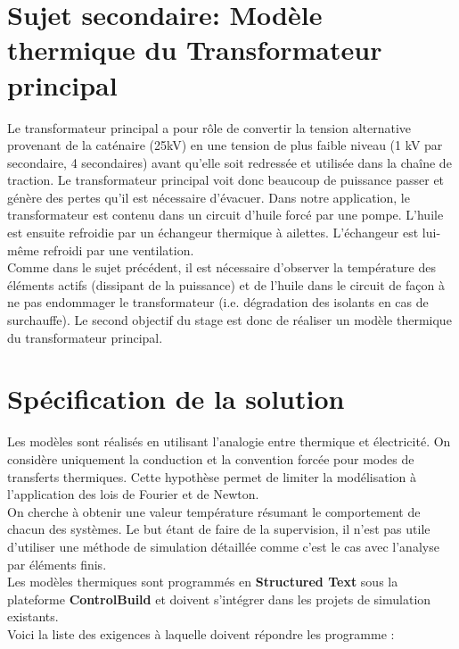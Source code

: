\documentclass[a4paper]{report}
\begin{document}
	\section{Sujet secondaire: Modèle thermique du Transformateur principal}
	Le transformateur principal a pour rôle de convertir la tension alternative provenant de la caténaire (25kV) en une tension de plus faible niveau (1 kV par secondaire, 4 secondaires) avant qu'elle soit redressée et utilisée dans la chaîne de traction.
	Le transformateur principal voit donc beaucoup de puissance passer et génère des pertes qu'il est nécessaire d'évacuer.
	Dans notre application, le transformateur est contenu dans un circuit d'huile forcé par une pompe.
	L'huile est ensuite refroidie par un échangeur thermique à ailettes. L'échangeur est lui-même refroidi par une ventilation.\\
	Comme dans le sujet précédent, il est nécessaire d'observer la température des éléments actifs (dissipant de la puissance) et de l'huile dans le circuit de façon à ne pas endommager le transformateur (i.e. dégradation des isolants en cas de surchauffe). Le second objectif du stage est donc de réaliser un modèle thermique du transformateur principal.\\
	
	
	\section{Spécification de la solution}
	
	Les modèles sont réalisés en utilisant l'analogie entre thermique et électricité. On considère uniquement la conduction et la convention forcée pour modes de transferts thermiques. Cette hypothèse permet de limiter la modélisation à l'application des lois de Fourier et de Newton.\\
	
	On cherche à obtenir une valeur température résumant le comportement de chacun des systèmes. Le but étant de faire de la supervision, il n'est pas utile d'utiliser une méthode de simulation détaillée comme c'est le cas avec l'analyse par éléments finis.\\
	
	Les modèles thermiques sont programmés en \textbf{Structured Text} sous la plateforme \textbf{ControlBuild} et doivent s'intégrer dans les projets de simulation existants.\\
	
	Voici la liste des exigences à laquelle doivent répondre les programme :
	
\end{document}
